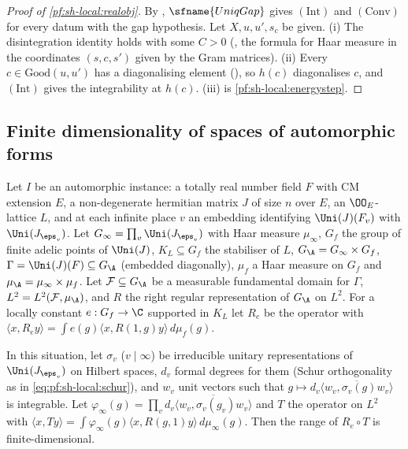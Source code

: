\begin{proof}[Proof of \cref{pf:sh-local:realobj}]
By , $\sfname{UniqGap}$ gives $(\mathrm{Int})$ and $(\mathrm{Conv})$
for every datum with the gap hypothesis. Let $X,u,u',s_c$ be given. (i) The disintegration identity holds with some
$C>0$ (, the formula for
Haar measure in the coordinates $(s,c,s')$ given by the Gram matrices). (ii) Every $c\in\mathrm{Good}(u,u')$ has a
diagonalising element (), so $h(c)$
diagonalises $c$, and $(\mathrm{Int})$ gives the integrability at $h(c)$. (iii) is
\cref{pf:sh-local:energystep}.
\end{proof}

\subsection{Finite dimensionality of spaces of automorphic forms}\label{sec:pf:sh-local:findim}

Let $I$ be an automorphic instance: a totally real number field $F$ with CM extension $E$, a non-degenerate hermitian
matrix $J$ of size $n$ over $E$, an $\OO_E$-lattice $L$, and at each infinite place $v$ an embedding identifying
$\Uni(J)(F_v)$ with $\Uni(J_{\eps_v})$. Let $G_\infty=\prod_v\Uni(J_{\eps_v})$ with Haar measure $\mu_\infty$, $G_f$
the group of finite adelic points of $\Uni(J)$, $K_L\subseteq G_f$ the stabiliser of $L$, $G_\A=G_\infty\times G_f$,
$\Gamma=\Uni(J)(F)\subseteq G_\A$ (embedded diagonally), $\mu_f$ a Haar measure on $G_f$ and
$\mu_\A=\mu_\infty\times\mu_f$. Let $\mathcal F\subseteq G_\A$ be a measurable fundamental domain for $\Gamma$,
$L^2=L^2(\mathcal F,\mu_\A)$, and $R$ the right regular representation of $G_\A$ on $L^2$. For a locally constant
$e:G_f\to\C$ supported in $K_L$ let $R_e$ be the operator with $\langle x,R_ey\rangle=\int e(g)\langle
x,R(1,g)y\rangle\,d\mu_f(g)$.

\begin{theorem}\label{pf:sh-local:findim}
In this situation, let $\sigma_v$ ($v\mid\infty$) be irreducible unitary representations of $\Uni(J_{\eps_v})$ on
Hilbert spaces, $d_v$ formal degrees for them (Schur orthogonality as in \eqref{eq:pf:sh-local:schur}), and $w_v$ unit
vectors such that $g\mapsto d_v\overline{\langle w_v,\sigma_v(g)w_v\rangle}$ is integrable. Let
$\varphi_\infty(g)=\prod_vd_v\overline{\langle w_v,\sigma_v(g_v)w_v\rangle}$ and $T$ the operator on $L^2$ with
$\langle x,Ty\rangle=\int\varphi_\infty(g)\langle x,R(g,1)y\rangle\,d\mu_\infty(g)$. Then the range of $R_e\circ T$
is finite-dimensional.
\end{theorem}

